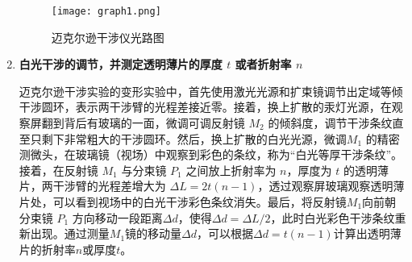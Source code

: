 \documentclass[dvipsnames, svgnames,a4paper,11pt]{article}
\begin{document}
\begin{enumerate}
			\begin{figure}[htbp]
				\centering
				\texttt{[image: graph1.png]}
				\caption{迈克尔逊干涉仪光路图}
				\label{fig:fig1}
			\end{figure}
			
			
		\item \textbf{白光干涉的调节，并测定透明薄片的厚度 $t$ 或者折射率 $n$}
		
%			
		
			迈克尔逊干涉实验的变形实验中，首先使用激光光源和扩束镜调节出定域等倾干涉圆环，表示两干涉臂的光程差接近零。接着，换上扩散的汞灯光源，在观察屏翻到背后有玻璃的一面，微调可调反射镜 $M_2$ 的倾斜度，调节干涉条纹直至只剩下非常粗大的干涉圆环。然后，换上扩散的白光光源，微调$ M_1$ 的精密测微头，在玻璃镜（视场）中观察到彩色的条纹，称为“白光等厚干涉条纹”。接着，在反射镜 $M_1$ 与分束镜 $P_1$ 之间放上折射率为 $n$，厚度为 $t$ 的透明薄片，两干涉臂的光程差增大为 $\Delta L=2t(n-1)$，透过观察屏玻璃观察透明薄片处，可以看到视场中的白光干涉彩色条纹消失。最后，将反射镜$ M_1 $向前朝分束镜 $P_1$ 方向移动一段距离$\Delta d$，使得$\Delta d = \Delta L /2$，此时白光彩色干涉条纹重新出现。通过测量$ M_1 $镜的移动量$\Delta d$，可以根据$\Delta d=t(n-1)$计算出透明薄片的折射率$n$或厚度$t$。
			
	\end{enumerate}
\end{document}
